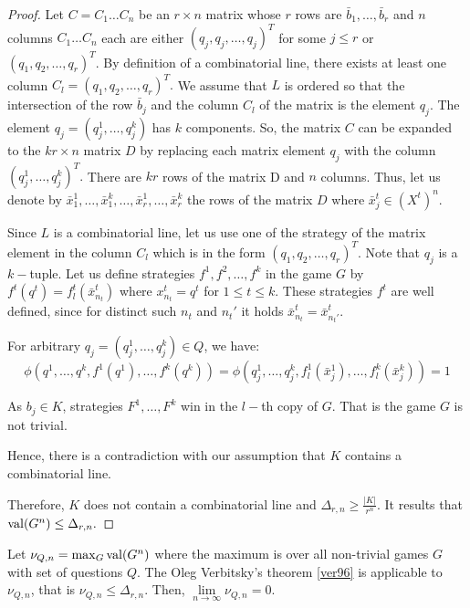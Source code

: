 \begin{proof}
Let $C=C_1\ldots C_n$ be an $r \times n$ matrix whose $r$ rows are $\bar{b}_1, \ldots, \bar{b}_r$ and $n$ columns $C_1\ldots C_n$ each are either $(q_j,q_j,\ldots,q_j)^T$ for some $j\leq r$ or $(q_1,q_2,\ldots,q_r)^T.$ By definition of a combinatorial line, there exists at least one column $C_l=(q_1,q_2,\ldots,q_r)^T.$ We assume that $L$ is ordered so that the intersection of the row $\bar{b}_j$ and the column $C_l$ of the matrix is the element $q_j.$ The element $q_j=(q_j^1,\ldots, q_j^k)$ has $k$ components. So, the  matrix $C$ can be expanded to the $kr \times n$ matrix $D$ by replacing each matrix element $q_j$ with the column $(q_j^1,\ldots, q_j^k)^T.$ There are $kr$ rows of the matrix D and $n$ columns. Thus, let us denote by $\bar{x}_1^1, \ldots, \bar{x}_1^k, \ldots, \bar{x}_r^1, \ldots, \bar{x}_r^k$ the rows of the matrix $D$ where $\bar{x}_j^t \in  (X^t)^n.$

Since $L$ is a combinatorial line, let us use one of the strategy of the matrix element in the column $C_l$ which is in the form $(q_1,q_2,\ldots,q_r)^T.$  Note that $q_j$ is a $k-$tuple. 
Let us define strategies $f^1,f^2, \ldots, f^k$ in the game $G$ by $f^t(q^t)=f_l^t(\bar{x}_{n_t}^t)$ where $x_{n_t}^t=q^t$ for $1\leq t \leq k.$ These strategies $f^t$ are well defined, since for distinct such $n_t$ and $n_t'$ it holds $\bar{x}_{n_t}^t= \bar{x}_{n_t'}^t.$

For  arbitrary $q_j= (q_j^1,\ldots, q_j^k) \in Q$, we have:
$$\phi (q^1,\ldots, q^k, f^1(q^1), \ldots, f^k(q^k))= \phi (q_j^1,\ldots, q_j^k, f_l^1(\bar{x}_j^1), \ldots, f_l^k(\bar{x}_j^k))=1$$

As $b_j \in K$, strategies $F^1, \ldots, F^k$ win in  the $l-$th copy of $G$. That is the game $G$ is not trivial. 

Hence, there is a contradiction with our assumption that $K$ contains a combinatorial line.

Therefore, $K$ does not contain a combinatorial line and $\Delta_{r,n} \geq  \frac{|K|}{r^n}$.
It results that $\mathrm{val} (G^n) \leq \Delta_{r,n}.$
\end{proof}

Let $\nu_{Q,n}=\max_G \mathrm{val} (G^n)$ where the maximum is over all non-trivial games $G$ with set of questions $Q.$ 
The Oleg Verbitsky's theorem \eqref{ver96} is applicable to $\nu_{Q,n}$, that is $\nu_{Q,n} \leq \Delta_{r,n}.$
Then, $\lim\limits_{n\longrightarrow \infty} \nu_{Q,n}=0.$


